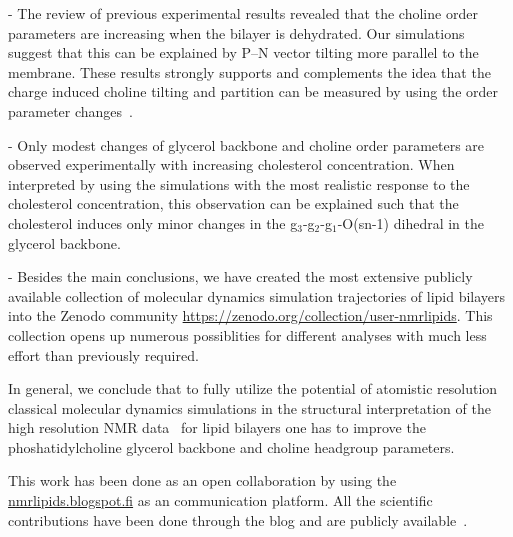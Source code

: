 \documentclass[journal=jacsat,manuscript=article]{achemso}
\begin{document}
- The review of previous experimental results revealed that the 
choline order parameters are increasing when the bilayer is dehydrated. Our simulations suggest that
this can be explained by P--N vector tilting more parallel to the membrane. 
These results strongly supports and complements the idea that the charge induced choline tilting and 
partition can be measured by using the order parameter changes~\cite{ionpaper,scherer89}.


- Only modest changes of glycerol backbone and choline order parameters are observed experimentally with increasing cholesterol concentration.
When interpreted by using the simulations with the most realistic response to the cholesterol concentration,
this observation can be explained such that the cholesterol induces only minor changes in the g$_3$-g$_2$-g$_1$-O(sn-1)
dihedral in the glycerol backbone.


- Besides the main conclusions, we have created the most extensive
publicly available collection of molecular dynamics simulation trajectories of lipid bilayers
into the Zenodo community \url{https://zenodo.org/collection/user-nmrlipids}. 
This collection opens up numerous possiblities for different analyses with
much less effort than previously required.

In general, we conclude that to fully utilize the potential of atomistic resolution classical molecular dynamics simulations
in the structural interpretation of the high resolution NMR data~\cite{ferreira14} for lipid bilayers one has to  
improve the phoshatidylcholine glycerol backbone and choline headgroup parameters.

This work has been done as an open collaboration by using the \url{nmrlipids.blogspot.fi} as an communication
platform. All the scientific contributions have been done through the blog and are publicly
available~\cite{nmrlipids}. 
\end{document}
